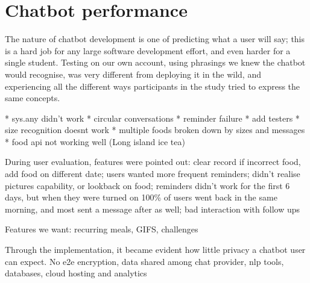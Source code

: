 \section{Chatbot performance}
The nature of chatbot development is one of predicting what a user will say; this is a hard job for any large software development effort, and even harder for a single student.
Testing on our own account, using phrasings we knew the chatbot would recognise, was very different from deploying it in the wild, and experiencing all the different ways participants in the study tried to express the same concepts.

* sys.any didn't work
* circular conversations
* reminder failure
* add testers
* size recognition doesnt work
* multiple foods broken down by sizes and messages
* food api not working well (Long island ice tea)


During user evaluation, features were pointed out: clear record if incorrect food, add food on different date; users wanted more frequent reminders; didn't realise pictures capability, or lookback on food; reminders didn't work for the first 6 days, but when they were turned on 100\% of users went back in the same morning, and most sent a message after as well; bad interaction with follow ups

Features we want: recurring meals, GIFS, challenges


Through the implementation, it became evident how little privacy a chatbot user can expect. No e2e encryption, data shared among chat provider, nlp tools, databases, cloud hosting and analytics
